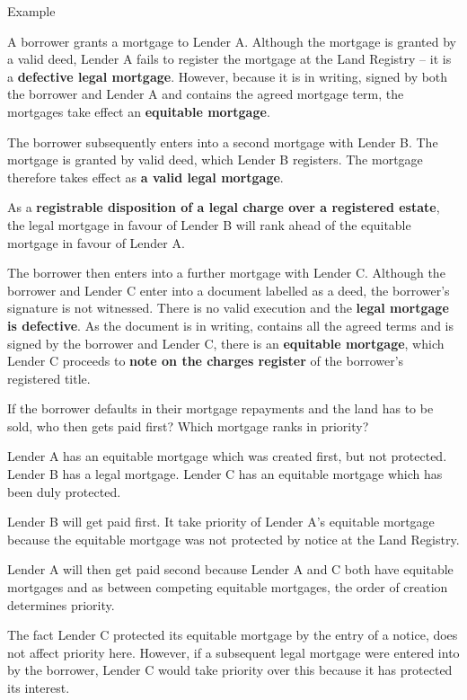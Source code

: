 \documentclass[
]{article}
\newenvironment{env-de3101d4-f08b-48eb-bc0e-2fa06f3bcf8e}
{
    \savenotes\tcolorbox[blanker,breakable,left=5pt,borderline west={2pt}{-4pt}{purple}]
}
{
    \endtcolorbox\spewnotes
}
\begin{document}
\begin{env-de3101d4-f08b-48eb-bc0e-2fa06f3bcf8e}

Example

A borrower grants a mortgage to Lender A. Although the mortgage is
granted by a valid deed, Lender A fails to register the mortgage at the
Land Registry -- it is a \textbf{defective legal mortgage}. However,
because it is in writing, signed by both the borrower and Lender A and
contains the agreed mortgage term, the mortgages take effect an
\textbf{equitable mortgage}.

The borrower subsequently enters into a second mortgage with Lender B.
The mortgage is granted by valid deed, which Lender B registers. The
mortgage therefore takes effect as \textbf{a valid legal mortgage}.

As a \textbf{registrable disposition of a legal charge over a registered
estate}, the legal mortgage in favour of Lender B will rank ahead of the
equitable mortgage in favour of Lender A.

The borrower then enters into a further mortgage with Lender C. Although
the borrower and Lender C enter into a document labelled as a deed, the
borrower's signature is not witnessed. There is no valid execution and
the \textbf{legal mortgage is defective}. As the document is in writing,
contains all the agreed terms and is signed by the borrower and Lender
C, there is an \textbf{equitable mortgage}, which Lender C proceeds to
\textbf{note on the charges register} of the borrower's registered
title.

If the borrower defaults in their mortgage repayments and the land has
to be sold, who then gets paid first? Which mortgage ranks in priority?

Lender A has an equitable mortgage which was created first, but not
protected. Lender B has a legal mortgage. Lender C has an equitable
mortgage which has been duly protected.

Lender B will get paid first. It take priority of Lender A's equitable
mortgage because the equitable mortgage was not protected by notice at
the Land Registry.

Lender A will then get paid second because Lender A and C both have
equitable mortgages and as between competing equitable mortgages, the
order of creation determines priority.

The fact Lender C protected its equitable mortgage by the entry of a
notice, does not affect priority here. However, if a subsequent legal
mortgage were entered into by the borrower, Lender C would take priority
over this because it has protected its interest.

\end{env-de3101d4-f08b-48eb-bc0e-2fa06f3bcf8e}
\end{document}
